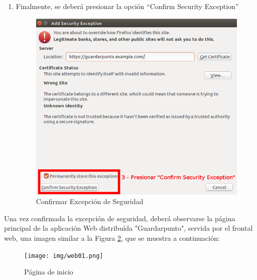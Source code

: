 \documentclass[12pt,spanish]{article}
\begin{document}
\begin{itemize}
\begin{enumerate}
\begin{center}
\begin{figure}[H]
 \end{figure}
\end{center}
\item{Finalmente, se deberá presionar la opción ``Confirm Security Exception''}
\begin{center}
 \begin{figure}[H]
 \begin{center}
   \includegraphics[width=14cm]{img/confirmSecurityException03.png}
   \caption{Confirmar Excepción de Seguridad}
   \label{fig:confirmSecurityException00}
 \end{center}
 \end{figure}
\end{center}
\end{enumerate}

Una vez confirmada la excepción de seguridad, deberá observarse la página principal de la aplicación Web distribuída "Guardarpunto", servida por el frontal web, una imagen similar a la Figura \ref{fig:initPage00}, que se muestra a continuación:
\begin{center}
 \begin{figure}[H]
 \begin{center}
   \texttt{[image: img/web01.png]}
   \caption{Página de inicio}
   \label{fig:initPage00}
 \end{center}
 \end{figure}
\end{center}

\end{itemize}
\end{document}
